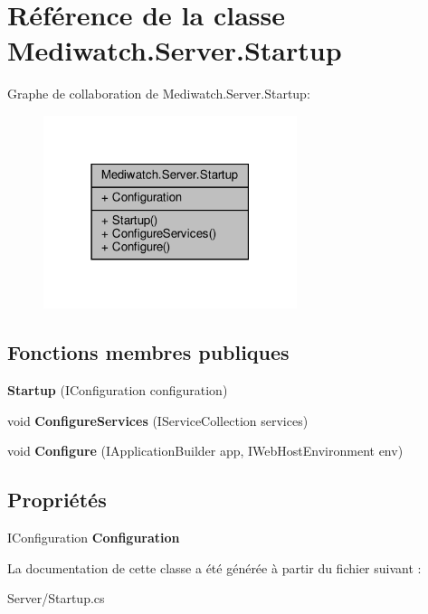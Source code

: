 \hypertarget{class_mediwatch_1_1_server_1_1_startup}{}\section{Référence de la classe Mediwatch.\+Server.\+Startup}
\label{class_mediwatch_1_1_server_1_1_startup}


Graphe de collaboration de Mediwatch.\+Server.\+Startup\+:
\nopagebreak
\begin{figure}[H]
\begin{center}
\leavevmode
\includegraphics[width=210pt]{class_mediwatch_1_1_server_1_1_startup__coll__graph}
\end{center}
\end{figure}
\subsection*{Fonctions membres publiques}
\begin{DoxyCompactItemize}
\item 
\mbox{\label{class_mediwatch_1_1_server_1_1_startup_a99779cbd7c184cbff98730a5f285a647}} 
{\bfseries Startup} (I\+Configuration configuration)
\item 
\mbox{\label{class_mediwatch_1_1_server_1_1_startup_a98b7f4b5e49a83c353687ec3c1cfa139}} 
void {\bfseries Configure\+Services} (I\+Service\+Collection services)
\item 
\mbox{\label{class_mediwatch_1_1_server_1_1_startup_af31b63124f79f812e79cb6f43df14a40}} 
void {\bfseries Configure} (I\+Application\+Builder app, I\+Web\+Host\+Environment env)
\end{DoxyCompactItemize}
\subsection*{Propriétés}
\begin{DoxyCompactItemize}
\item 
\mbox{\label{class_mediwatch_1_1_server_1_1_startup_ae3d0512feacc2872ab0ec4d5082626a6}} 
I\+Configuration {\bfseries Configuration}
\end{DoxyCompactItemize}


La documentation de cette classe a été générée à partir du fichier suivant \+:\begin{DoxyCompactItemize}
\item 
Server/Startup.\+cs\end{DoxyCompactItemize}

